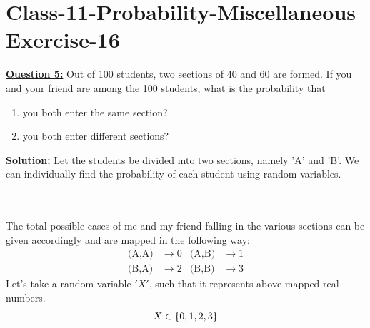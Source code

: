 \documentclass[journal,12pt,twocolumn]{IEEEtran}
\begin{document}
	\section{Class-11-Probability-Miscellaneous Exercise-16}
\par\textbf{\underline{Question 5:}} Out of 100 students, two sections of 40 and 60 are formed. If you and your friend are among the 100 students, what is the probability that
    \begin{enumerate}[label=(\roman*)]
    \item you both enter the same section?
    \item you both enter different sections?
	\end{enumerate}
	\par\textbf{\underline{Solution:}} Let the students be divided into two sections, namely 'A' and 'B'. We can individually find the probability of each student using random variables.\\
	\\
	\\
	\par The total possible cases of me and my friend falling in the various sections can be given accordingly and are mapped in the following way:
	\begin{align*}
    \text{(A,A)}&\rightarrow 0  &  \text{(A,B)}&\rightarrow 1\\
    \text{(B,A)}&\rightarrow 2  &  \text{(B,B)}&\rightarrow 3
    \end{align*}
    Let's take a random variable $'X'$, such that it represents above mapped real numbers.
    \begin{align*}
    X \in \left\{0,1,2,3\right\}
    \end{align*}
\end{document}
